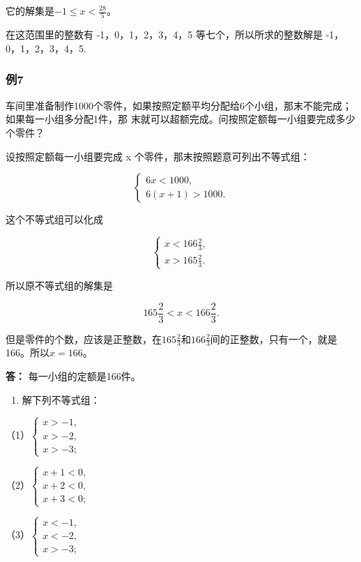 它的解集是\(-1 \leqslant x < \frac{28}{5}\)。

在这范围里的整数有 -1，0，1，2，3，4，5 等七个，所以所求的整数解是
-1，0，1，2，3，4，5.

\subsubsection{例7}

车间里准备制作1000个零件，如果按照定额平均分配给6个小组，那末不能完成；如果每一小组多分配1件，那
末就可以超额完成。问按照定额每一小组要完成多少个零件？

 设按照定额每一小组要完成 x
个零件，那末按照题意可列出不等式组：

\[
\left\{ \begin{array}{l} 6 x < 1000, \\ 6 (x + 1) > 1000. \end{array} \right.
\]

这个不等式组可以化成

\[
\left\{ \begin{array}{l} x < 166 \frac{2}{3}, \\ x > 165 \frac{2}{3}. \end{array} \right.
\]

所以原不等式组的解集是

\[
165 \frac{2}{3} < x < 166 \frac{2}{3}.
\]

但是零件的个数，应该是正整数，在\(165\frac{2}{3}\)和\(166\frac{2}{3}\)间的正整数，只有一个，就是166。所以\(x = 166\)。

\textbf{答：} 每一小组的定额是166件。

\begin{enumerate}
\item
  解下列不等式组：
\end{enumerate}

（1）\(\left\{ \begin{array}{l} x > -1, \\ x > -2, \\ x > -3; \end{array} \right.\)

（2）\(\left\{ \begin{array}{l} x + 1 < 0, \\ x + 2 < 0, \\ x + 3 < 0; \end{array} \right.\)

（3）\(\left\{ \begin{array}{l} x < -1, \\ x < -2, \\ x > -3; \end{array} \right.\)

